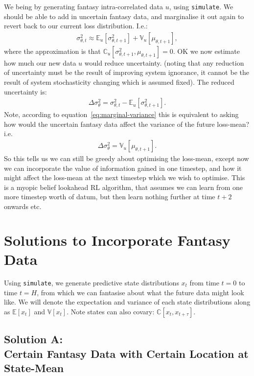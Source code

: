 \documentclass[a4paper,10pt]{article}
\newcommand{\C}{\mathbb{C}}
\newcommand{\E}{\mathbb{E}}
\newcommand{\V}{\mathbb{V}}
\begin{document}
We being by generating fantasy intra-correlated data $u$, using {\tt simulate}.
We should be able to add in uncertain fantasy data,
and marginalise it out again to revert back to our current loss distribution.
I.e.:
\begin{eqnarray}
 \sigma^2_{\theta,t} \approx \E_u[\sigma^2_{\theta,t+1}] + \V_u[\mu_{\theta,t+1}], \label{eq:marginal-variance}
\end{eqnarray}
where the approximation is that $\mathbb{C}_u[\sigma^2_{\theta,t+1},\mu_{\theta,t+1}] = 0$.
OK we now estimate how much our new data $u$ would reduce uncertainty.
(noting that any reduction of uncertainty must be the result of improving system ignorance,
it cannot be the result of system stochasticity changing which is assumed fixed).
The reduced uncertainty is:
\begin{eqnarray}
 \Delta \sigma^2_\theta =
 \sigma^2_{\theta,t} - \E_u[\sigma^2_{\theta,t+1}].
\end{eqnarray}
Note, according to equation~\ref{eq:marginal-variance}
this is equivalent
to asking how would the uncertain fantasy data affect the variance of the future loss-mean?
i.e.
\begin{eqnarray}
 \Delta \sigma^2_\theta = \V_u[\mu_{\theta,t+1}].
\end{eqnarray}
So this tells us we can still be greedy about optimising the loss-mean,
except now we can incorporate the value of information gained in one timestep,
and how it might affect the loss-mean at the next timestep which we wish to optimise.
This is a myopic belief lookahead RL algorithm, that assumes we can learn from one more timestep worth of datum,
but then learn nothing further at time $t+2$ onwards etc.

\section{Solutions to Incorporate Fantasy Data}\label{sec:solns}

Using {\tt simulate}, we generate predictive state distributions $x_t$ from time $t=0$ to time $t=H$,
from which we can fantasise about what the future data might look like.
We will denote the expectation and variance of each state distributions along as $\E[x_t]$ and $\V[x_t]$.
Note states can also covary: $\C[x_t,x_{t+\tau}]$.

\subsection{Solution A: \\ \small{Certain Fantasy Data with Certain Location at State-Mean}}
\end{document}
